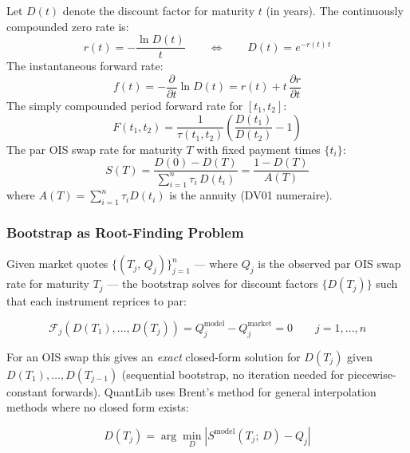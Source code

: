 \documentclass[11pt, a4paper]{article}
\begin{document}
\begin{tcolorbox}[definition, title={Fundamental Curve Relations}]
Let $D(t)$ denote the discount factor for maturity $t$ (in years).
The continuously compounded zero rate is:
\begin{equation}
  r(t) = -\frac{\ln D(t)}{t}
  \qquad\Longleftrightarrow\qquad
  D(t) = e^{-r(t)\,t}
\end{equation}
The instantaneous forward rate:
\begin{equation}
  f(t) = -\frac{\partial}{\partial t}\ln D(t)
       = r(t) + t\,\frac{\partial r}{\partial t}
\end{equation}
The simply compounded period forward rate for $[t_1, t_2]$:
\begin{equation}
  F(t_1, t_2) = \frac{1}{\tau(t_1,t_2)}
                \left(\frac{D(t_1)}{D(t_2)} - 1\right)
\end{equation}
The par OIS swap rate for maturity $T$ with fixed payment times $\{t_i\}$:
\begin{equation}
  S(T) = \frac{D(0) - D(T)}{\sum_{i=1}^{n} \tau_i\, D(t_i)}
       = \frac{1 - D(T)}{A(T)}
\end{equation}
where $A(T) = \sum_{i=1}^{n}\tau_i D(t_i)$ is the annuity (DV01 numeraire).
\end{tcolorbox}

\subsubsection{Bootstrap as Root-Finding Problem}

Given market quotes $\{(T_j,\, Q_j)\}_{j=1}^{n}$ — where $Q_j$ is the observed
par OIS swap rate for maturity $T_j$ — the bootstrap solves for discount factors
$\{D(T_j)\}$ such that each instrument reprices to par:

\begin{equation}
  \mathcal{F}_j\!\left(D(T_1),\ldots,D(T_j)\right)
  = Q_j^{\text{model}} - Q_j^{\text{market}} = 0
  \qquad j = 1,\ldots,n
\end{equation}

For an OIS swap this gives an \emph{exact} closed-form solution for $D(T_j)$
given $D(T_1),\ldots,D(T_{j-1})$ (sequential bootstrap, no iteration needed
for piecewise-constant forwards). QuantLib uses Brent's method for general
interpolation methods where no closed form exists:

\begin{equation}
  D(T_j) = \arg\min_{D} \left|S^{\text{model}}(T_j;\, D) - Q_j\right|
\end{equation}
\end{document}

